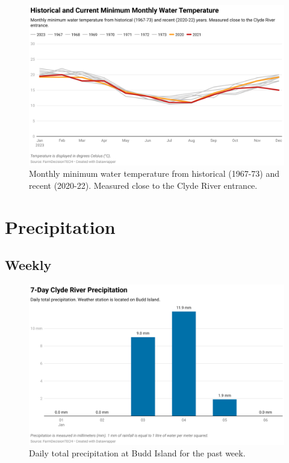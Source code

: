 \documentclass[10pt]{article}
\begin{document}
\begin{figure}[H]
\centering
\includegraphics[width=\textwidth]{combined-historical-temperature-min.png}
\caption[Historical Minimum Water Temperature]{Monthly minimum water temperature from historical (1967-73) and recent (2020-22). Measured close to the Clyde River entrance.}
\end{figure}

\section{Precipitation}
\subsection{Weekly}

\begin{figure}[H]
\centering
\includegraphics[width=\textwidth]{weekly-precipitation.png}
\caption[Daily Total Precipitation Budd Island]{Daily total precipitation at Budd Island for the past week.}
\end{figure}
\end{document}
